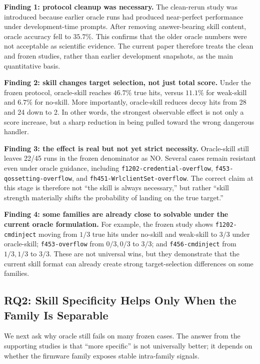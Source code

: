 ﻿\documentclass[preprint,12pt]{elsarticle}
\begin{document}
\textbf{Finding 1: protocol cleanup was necessary.}
The clean-rerun study was introduced because earlier oracle runs had
produced near-perfect performance under development-time prompts.  After
removing answer-bearing skill content, oracle accuracy fell to $35.7\%$.
This confirms that the older oracle numbers were not acceptable as
scientific evidence.  The current paper therefore treats the clean and
frozen studies, rather than earlier development snapshots, as the main
quantitative basis.

\textbf{Finding 2: skill changes target selection, not just total score.}
Under the frozen protocol, oracle-skill reaches $46.7\%$ true hits, versus
$11.1\%$ for weak-skill and $6.7\%$ for no-skill.  More importantly,
oracle-skill reduces decoy hits from 28 and 24 down to 2.  In other words,
the strongest observable effect is not only a score increase, but a sharp
reduction in being pulled toward the wrong dangerous handler.

\textbf{Finding 3: the effect is real but not yet strict necessity.}
Oracle-skill still leaves 22/45 runs in the frozen denominator as NO.
Several cases remain resistant even under oracle guidance, including
\texttt{f1202-credential-overflow}, \texttt{f453-qossetting-overflow}, and
\texttt{fh451-WrlclientSet-overflow}.  The correct claim at this stage is
therefore not ``the skill is always necessary,'' but rather ``skill
strength materially shifts the probability of landing on the true
target.''

\textbf{Finding 4: some families are already close to solvable under the
current oracle formulation.}
For example, the frozen study shows
\texttt{f1202-cmdinject} moving from $1/3$ true hits under no-skill and
weak-skill to $3/3$ under oracle-skill; \texttt{f453-overflow} from
$0/3,0/3$ to $3/3$; and \texttt{f456-cmdinject} from $1/3,1/3$ to $3/3$.
These are not universal wins, but they demonstrate that the current skill
format can already create strong target-selection differences on some
families.

\subsection{RQ2: Skill Specificity Helps Only When the Family Is Separable}
\label{sec:results_rq2}

We next ask why oracle still fails on many frozen cases.  The answer from
the supporting studies is that ``more specific'' is not universally better;
it depends on whether the firmware family exposes stable intra-family
signals.
\end{document}
